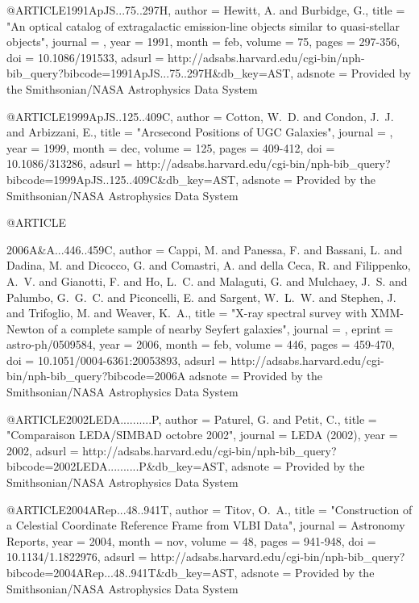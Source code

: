 {{{{{{{{{{{{{{{{@ARTICLE{1991ApJS...75..297H,
   author = {{Hewitt}, A. and {Burbidge}, G.},
    title = "{An optical catalog of extragalactic emission-line objects similar to quasi-stellar objects}",
  journal = {\apjs},
     year = 1991,
    month = feb,
   volume = 75,
    pages = {297-356},
      doi = {10.1086/191533},
   adsurl = {http://adsabs.harvard.edu/cgi-bin/nph-bib_query?bibcode=1991ApJS...75..297H&db_key=AST},
  adsnote = {Provided by the Smithsonian/NASA Astrophysics Data System}
}



@ARTICLE{1999ApJS..125..409C,
   author = {{Cotton}, W.~D. and {Condon}, J.~J. and {Arbizzani}, E.},
    title = "{Arcsecond Positions of UGC Galaxies}",
  journal = {\apjs},
     year = 1999,
    month = dec,
   volume = 125,
    pages = {409-412},
      doi = {10.1086/313286},
   adsurl = {http://adsabs.harvard.edu/cgi-bin/nph-bib_query?bibcode=1999ApJS..125..409C&db_key=AST},
  adsnote = {Provided by the Smithsonian/NASA Astrophysics Data System}
}



@ARTICLE{2006A&A...446..459C,
   author = {{Cappi}, M. and {Panessa}, F. and {Bassani}, L. and {Dadina}, M. and 
	{Dicocco}, G. and {Comastri}, A. and {della Ceca}, R. and {Filippenko}, A.~V. and 
	{Gianotti}, F. and {Ho}, L.~C. and {Malaguti}, G. and {Mulchaey}, J.~S. and 
	{Palumbo}, G.~G.~C. and {Piconcelli}, E. and {Sargent}, W.~L.~W. and 
	{Stephen}, J. and {Trifoglio}, M. and {Weaver}, K.~A.},
    title = "{X-ray spectral survey with XMM-Newton of a complete sample of nearby Seyfert galaxies}",
  journal = {\aap},
   eprint = {astro-ph/0509584},
     year = 2006,
    month = feb,
   volume = 446,
    pages = {459-470},
      doi = {10.1051/0004-6361:20053893},
   adsurl = {http://adsabs.harvard.edu/cgi-bin/nph-bib_query?bibcode=2006A%
  adsnote = {Provided by the Smithsonian/NASA Astrophysics Data System}
}



@ARTICLE{2002LEDA..........P,
   author = {{Paturel}, G. and {Petit}, C.},
    title = "{Comparaison LEDA/SIMBAD octobre 2002}",
  journal = {LEDA (2002)},
     year = 2002,
   adsurl = {http://adsabs.harvard.edu/cgi-bin/nph-bib_query?bibcode=2002LEDA..........P&db_key=AST},
  adsnote = {Provided by the Smithsonian/NASA Astrophysics Data System}
}



@ARTICLE{2004ARep...48..941T,
   author = {{Titov}, O.~A.},
    title = "{Construction of a Celestial Coordinate Reference Frame from VLBI Data}",
  journal = {Astronomy Reports},
     year = 2004,
    month = nov,
   volume = 48,
    pages = {941-948},
      doi = {10.1134/1.1822976},
   adsurl = {http://adsabs.harvard.edu/cgi-bin/nph-bib_query?bibcode=2004ARep...48..941T&db_key=AST},
  adsnote = {Provided by the Smithsonian/NASA Astrophysics Data System}
}



}}}}}}}}}}}}}}}}}
